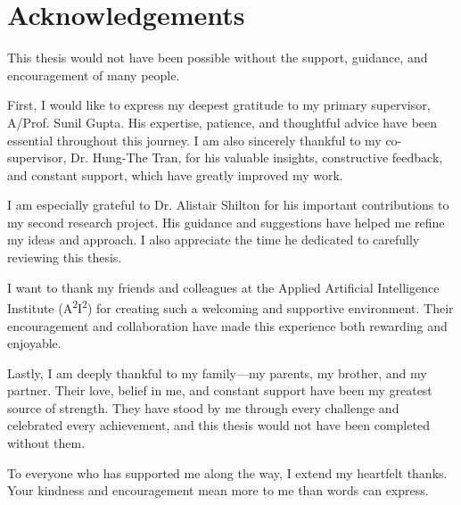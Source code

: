 \chapter*{Acknowledgements}
{}
\vspace*{\fill}
\noindent This thesis would not have been possible without the support, guidance, and encouragement of many people.

First, I would like to express my deepest gratitude to my primary supervisor, A/Prof. Sunil Gupta. His expertise, patience, and thoughtful advice have been essential throughout this journey. I am also sincerely thankful to my co-supervisor, Dr. Hung-The Tran, for his valuable insights, constructive feedback, and constant support, which have greatly improved my work.

I am especially grateful to Dr. Alistair Shilton for his important contributions to my second research project. His guidance and suggestions have helped me refine my ideas and approach. I also appreciate the time he dedicated to carefully reviewing this thesis.

I want to thank my friends and colleagues at the Applied Artificial Intelligence Institute (A\textsuperscript{2}I\textsuperscript{2}) for creating such a welcoming and supportive environment. Their encouragement and collaboration have made this experience both rewarding and enjoyable.

Lastly, I am deeply thankful to my family—my parents, my brother, and my partner. Their love, belief in me, and constant support have been my greatest source of strength. They have stood by me through every challenge and celebrated every achievement, and this thesis would not have been completed without them.

To everyone who has supported me along the way, I extend my heartfelt thanks. Your kindness and encouragement mean more to me than words can express.
\vspace*{\fill}
\cleardoublepage
\pagestyle{plain}